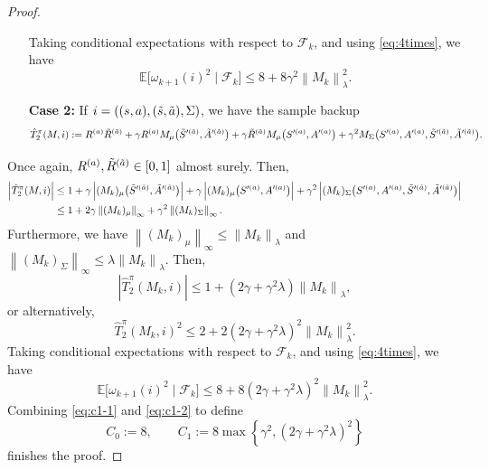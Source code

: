 \documentclass[10pt,a4paper]{amsart}
\newcommand{\E}{\mathbb{E}}
\newcommand{\LVert}{\left\lVert}
\newcommand{\Lvert}{\left\lvert}
\newcommand{\RVert}{\right\rVert}
\newcommand{\Rvert}{\right\rvert}
\newcommand{\norm}[1]{\left\lVert #1\right\rVert}
\begin{document}
\begin{proof}
\begin{enumerate}[leftmargin=*, itemsep=2pt, align=left]
Taking conditional expectations with respect to $\mathcal{F}_k$, and using \eqref{eq:4times}, we have
\begin{equation}\label{eq:c1-1}
\E\big[\omega_{k+1}(i)^2 \mid \mathcal{F}_k\big] \le 8 + 8\gamma^2\LVert M_k\RVert^2_\lambda.
\end{equation}
\item[\textbf{Case 2:}] If $i = ((s, a), (\Tilde{s}, \Tilde{a}), \Sigma)$, we have the sample backup
\begin{equation}
\hat{T}^\pi_2(M, i):=R^{(a)}\Tilde{R}^{(\Tilde{a})}+\gamma R^{(a)} M_\mu\big(\Tilde{S}'^{(\Tilde{a})},\Tilde{A}'^{(\Tilde{a})}\big)+  \gamma \Tilde{R}^{(\Tilde{a})} M_\mu\big(S'^{(a)},A'^{(a)}\big) + \gamma^2 M_\Sigma\big(S'^{(a)}, A'^{(a)}, \Tilde{S}'^{(\Tilde{a})}, \Tilde{A}'^{(\Tilde{a})}\big).
\end{equation}
\end{enumerate}
Once again, $R^{(a)}, \Tilde{R}^{(\Tilde{a})} \in [0, 1]$ almost surely. Then,
\begin{equation}
\begin{split}
\Lvert \hat{T}^\pi_2(M, i) \Rvert &\le 1 + \gamma \Lvert (M_k)_\mu\big(\Tilde{S}'^{(\Tilde{a})},\Tilde{A}'^{(\Tilde{a})}\big)\Rvert + \gamma \Lvert(M_k)_\mu\big(S'^{(a)},A'^{(a)}\big) \Rvert + \gamma^2 \Lvert(M_k)_\Sigma\big(S'^{(a)}, A'^{(a)}, \Tilde{S}'^{(\Tilde{a})}, \Tilde{A}'^{(\Tilde{a})} \big) \Rvert \\
&\le 1 + 2\gamma \LVert (M_k)_\mu \RVert_\infty + \gamma^2 \LVert (M_k)_\Sigma \RVert_\infty.
\end{split}
\end{equation}
Furthermore, we have $\norm{(M_k)_\mu}_\infty \le \norm{M_k}_\lambda$ and $\norm{(M_k)_\Sigma}_\infty \le \lambda\norm{M_k}_\lambda$. Then,
\begin{equation}
\Lvert \hat{T}^\pi_2(M_k, i) \Rvert \le 1+ (2\gamma + \gamma^2\lambda) \LVert M_k \RVert_\lambda,
\end{equation}
or alternatively,
\begin{equation}
\hat{T}^\pi_2(M_k, i)^2 \le 2 + 2(2\gamma + \gamma^2\lambda)^2\LVert M_k \RVert^2_\lambda.
\end{equation}
Taking conditional expectations with respect to $\mathcal{F}_k$, and using \eqref{eq:4times}, we have
\begin{equation}\label{eq:c1-2}
\E\big[\omega_{k+1}(i)^2 \mid \mathcal{F}_k\big] \le 8 + 8(2\gamma +\gamma^2\lambda)^2\LVert M_k \RVert^2_\lambda.
\end{equation}
Combining \eqref{eq:c1-1} and \eqref{eq:c1-2} to define
\begin{equation}
C_0 := 8, \qquad C_1:= 8 \max\left\{\gamma^2, (2\gamma +\gamma^2\lambda)^2 \right\}
\end{equation}
finishes the proof.
\end{proof}
\end{document}

